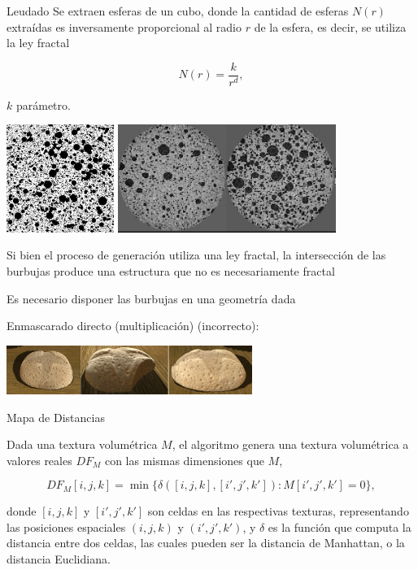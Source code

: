 \documentclass[spanish,unknownkeysallowed]{beamer}
\begin{document}
\begin{frame}{Leudado}
Se extraen esferas de un cubo, donde la cantidad de esferas $N(r)$ extraídas es inversamente proporcional al radio $r$ de la esfera, es decir, se utiliza la ley fractal

\begin{equation*}
N(r) = \frac{k}{r^{d}},
\end{equation*}

$k$ parámetro.

\includegraphics[height=3.5cm]{../figures/bubbles}
\includegraphics[height=3.5cm]{../figures/proving}
\end{frame}

\begin{frame}
Si bien el proceso de generación utiliza una ley fractal, la intersección de las burbujas produce una estructura que no es necesariamente fractal

\vspace{1cm}

Es necesario disponer las burbujas en una geometría dada

Enmascarado directo (multiplicación) (incorrecto):

\centerline{\includegraphics[width=8cm]{../figures/intersectProblem}}
\end{frame}

\begin{frame}{Mapa de Distancias}

Dada una textura volumétrica $M$, el algoritmo genera una textura volumétrica a valores reales $DF_{M}$ con las mismas dimensiones que $M$,


$$DF_{M}[i,j,k] = \min \bigg\{ \delta([i,j,k],[i',j',k']): M[i',j',k'] = 0 \bigg\},$$


\noindent donde $[i,j,k]$ y $[i',j',k']$ son celdas en las respectivas texturas, representando las posiciones espaciales $(i,j,k)$ y $(i',j',k')$, y $\delta$ es la función que computa la distancia entre dos celdas, las cuales pueden ser la distancia de Manhattan, o la distancia Euclidiana.

\end{frame}
\end{document}
